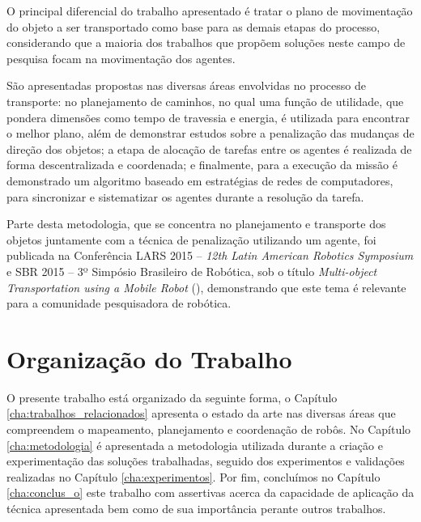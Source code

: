 O principal diferencial do trabalho apresentado é tratar o plano de movimentação do objeto a ser transportado como base para as demais etapas do processo, considerando que a maioria dos trabalhos que propõem soluções neste campo de pesquisa focam na movimentação dos agentes.

São apresentadas propostas nas diversas áreas envolvidas no processo de transporte: no planejamento de caminhos, no qual uma função de utilidade, que pondera dimensões como tempo de travessia e energia, é utilizada para encontrar o melhor plano, além de demonstrar estudos sobre a penalização das mudanças de direção dos objetos; a etapa de alocação de tarefas entre os agentes é realizada de forma descentralizada e coordenada; e finalmente, para a execução da missão é demonstrado um algoritmo baseado em estratégias de redes de computadores, para sincronizar e sistematizar os agentes durante a resolução da tarefa.

Parte desta metodologia, que se concentra no planejamento e transporte dos objetos juntamente com a técnica de penalização utilizando um agente, foi publicada na Conferência LARS 2015 -- \emph{12th Latin American Robotics Symposium} e SBR 2015 -- 3º Simpósio Brasileiro de Robótica, sob o título \emph{Multi-object Transportation using a Mobile Robot} (\cite{Melo2015}), demonstrando que este tema é relevante para a comunidade pesquisadora de robótica.

\section{Organização do Trabalho} %
\label{sec:organiza_o_do_trabalho}

O presente trabalho está organizado da seguinte forma, o Capítulo \ref{cha:trabalhos_relacionados} apresenta o estado da arte nas diversas áreas que compreendem o mapeamento, planejamento e coordenação de robôs.
No Capítulo \ref{cha:metodologia} é apresentada a metodologia utilizada durante a criação e experimentação das soluções trabalhadas, seguido dos experimentos e validações realizadas no Capítulo \ref{cha:experimentos}.
Por fim, concluímos no Capítulo \ref{cha:conclus_o} este trabalho com assertivas acerca da capacidade de aplicação da técnica apresentada bem como de sua importância perante outros trabalhos.


